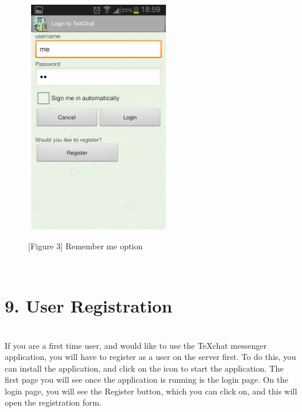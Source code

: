 \documentclass[29pt,a4paper]{moderncv}
\begin{document}
		\noindent\begin{figure}
									\centering
									\includegraphics[width=2.5in, height=4.0in]{./Screenshot_2013-10-23-18-59-04.png} \\
									\centering \caption{[Figure 3] Remember me option}
									\end{figure}\\ 
		\vspace{4mm}
		
\newpage

		\section*{9. User Registration}
		\vspace{5mm}
		\\If you are a first time user, and would like to use the TeXchat messenger application, you will have to register as a user on the server first.  To do this, you can install the application, and click on the icon to start the application.  The first page you will see once the application is running is the login page.  On the login page, you will see the Register button, which you can click on, and this will open the registration form.  
		
\end{document}
